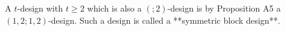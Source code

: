 A $t$-design with $t \geq 2$ which is also a $(; 2)$-design is by Proposition A5 a $(1, 2; 1, 2)$-design. Such a design is called a **symmetric block design**.
